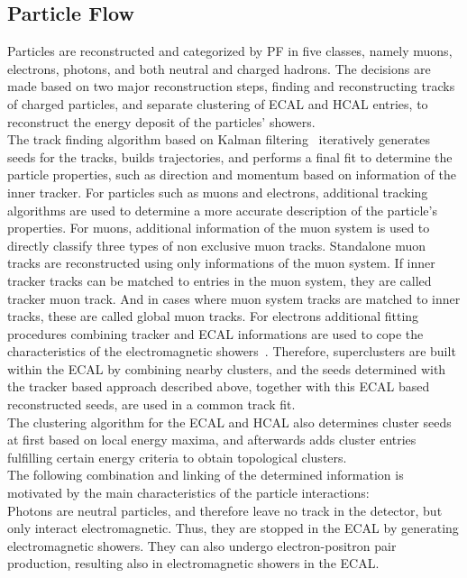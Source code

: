 \subsection{Particle Flow}
Particles are reconstructed and categorized by PF in five classes, namely muons, electrons, photons, and both neutral and charged hadrons. The decisions are made based on two major reconstruction steps, finding and reconstructing tracks of charged particles, and separate clustering of ECAL and HCAL entries, to reconstruct the energy deposit of the particles' showers.\\
The track finding algorithm based on Kalman filtering~\cite{Kalman} iteratively generates seeds for the tracks, builds trajectories, and performs a final fit to determine the particle properties, such as direction and momentum based on information of the inner tracker.
For particles such as muons and electrons, additional tracking algorithms are used to determine a more accurate description of the particle's properties. For muons, additional information of the muon system is used to directly classify three types of non exclusive muon tracks. Standalone muon tracks are reconstructed using only informations of the muon system. If inner tracker tracks can be matched to entries in the muon system, they are called tracker muon track. And in cases where muon system tracks are matched to inner tracks, these are called global muon tracks.
For electrons additional fitting procedures combining tracker and ECAL informations are used to cope the characteristics of the electromagnetic showers~\cite{GSFTrack}. Therefore, superclusters are built within the ECAL by combining nearby clusters, and the seeds determined with the tracker based approach described above, together with this ECAL based reconstructed seeds, are used in a common track fit.\\
The clustering algorithm for the ECAL and HCAL also determines cluster seeds at first based on local energy maxima, and afterwards adds cluster entries fulfilling certain energy criteria to obtain topological clusters.\\
The following combination and linking of the determined information is motivated by the main characteristics of the particle interactions:\\
Photons are neutral particles, and therefore leave no track in the detector, but only interact electromagnetic. Thus, they are stopped in the ECAL by generating electromagnetic showers. They can also undergo electron-positron pair production, resulting also in electromagnetic showers in the ECAL.\\
